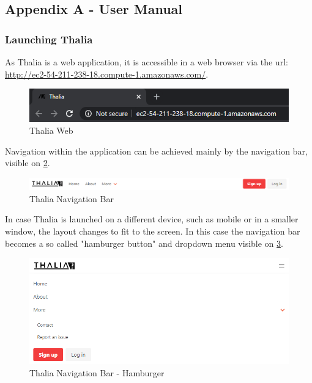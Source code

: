 \documentclass[main.tex]{subfiles}
\begin{document}
\subsection{Appendix A - User Manual}
\label{user_manual}
\subsubsection{Launching Thalia}
As Thalia is a web application, it is accessible in a web browser via the url: \url{http://ec2-54-211-238-18.compute-1.amazonaws.com/}.

\begin{figure}[H]
   \centering
   \includegraphics[scale=0.8]{10Appendices/081User/081Pictures/thalia_domain.png}
   \caption{Thalia Web}
   \label{thalia_web}
\end{figure}

Navigation within the application can be achieved mainly by the navigation bar, visible on \figurename{\ref{thalia_navbar}}.

\begin{figure}[H]
   \centering
   \includegraphics[width=\textwidth]{10Appendices/081User/081Pictures/navbar.png}
   \caption{Thalia Navigation Bar}
   \label{thalia_navbar}
\end{figure}

In case Thalia is launched on a different device, such as mobile or in a smaller window, the layout changes to fit to the screen. In this case the navigation bar becomes a so called "hamburger button" and dropdown menu visible on \figurename{\ref{thalia_navbar_hamburger}}.

\begin{figure}[H]
   \centering
   \includegraphics[width=\textwidth]{10Appendices/081User/081Pictures/navbar_hamburger.png}
   \caption{Thalia Navigation Bar - Hamburger}
   \label{thalia_navbar_hamburger}
\end{figure}
\end{document}
